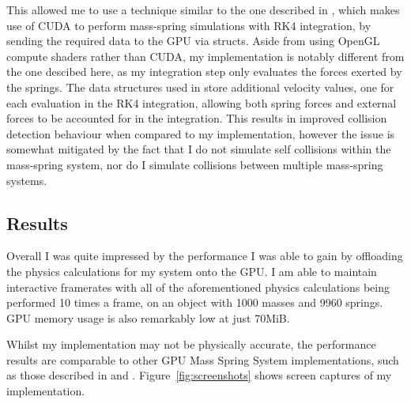 \documentclass[]{acmsiggraph}
\begin{document}
This allowed me to use a technique similar to the one described in \cite{siggraphPixar}, which makes use of CUDA to perform mass-spring simulations with RK4 integration, by sending the required data to the GPU via structs. Aside from using OpenGL compute shaders rather than CUDA, my implementation is notably different from the one descibed here, as my integration step only evaluates the forces exerted by the springs. The data structures used in \cite{siggraphPixar} store additional velocity values, one for each evaluation in the RK4 integration, allowing both spring forces and external forces to be accounted for in the integration. This results in improved collision detection behaviour when compared to my implementation, however the issue is somewhat mitigated by the fact that I do not simulate self collisions within the mass-spring system, nor do I simulate collisions between multiple mass-spring systems.

\subsection{Results}

Overall I was quite impressed by the performance I was able to gain by offloading the physics calculations for my system onto the GPU. I am able to maintain interactive framerates with all of the aforementioned physics calculations being performed 10 times a frame, on an object with 1000 masses and 9960 springs. GPU memory usage is also remarkably low at just 70MiB.

Whilst my implementation may not be physically accurate, the performance results are comparable to other GPU Mass Spring System implementations, such as those described in \cite{massSpringGPU} and \cite{siggraphPixar}. Figure~\ref{fig:screenshots} shows screen captures of my implementation.
\end{document}
